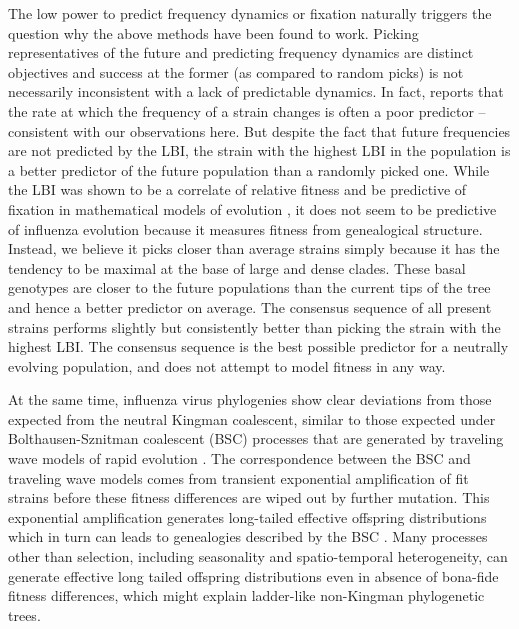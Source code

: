 \documentclass[reprint,amsmath,amssymb,superscriptaddress,showpacs,rmp]{revtex4-1}
\begin{document}
The low power to predict frequency dynamics or fixation naturally triggers the question why the above methods have been found to work.
Picking representatives of the future and predicting frequency dynamics are distinct objectives and success at the former (as compared to random picks) is not necessarily inconsistent with a lack of predictable dynamics.
In fact, \citep{huddleston_integrating_2020} reports that the rate at which the frequency of a strain changes is often a poor predictor -- consistent with our observations here.
But despite the fact that future frequencies are not predicted by the LBI, the strain with the highest LBI in the population is a better predictor of the future population than a randomly picked one.
While the LBI was shown to be a correlate of relative fitness and be predictive of fixation in mathematical models of evolution \citep{neher_predicting_2014}, it does not seem to be predictive of influenza evolution because it measures fitness from genealogical structure.
Instead, we believe it picks closer than average strains simply because it has the tendency to be maximal at the base of large and dense clades.
These basal genotypes are closer to the future populations than the current tips of the tree and hence a better predictor on average.
The consensus sequence of all present strains performs slightly but consistently better than picking the strain with the highest LBI.
The consensus sequence is the best possible predictor for a neutrally evolving population, and does not attempt to model fitness in any way.

At the same time, influenza virus phylogenies show clear deviations from those expected from the neutral Kingman coalescent, similar to those expected under Bolthausen-Sznitman coalescent (BSC) processes that are generated by traveling wave models of rapid evolution \citep{neher_genealogies_2013,desai_genetic_2013}.
The correspondence between the BSC and traveling wave models comes from transient exponential amplification of fit strains before these fitness differences are wiped out by further mutation.
This exponential amplification generates long-tailed effective offspring distributions which in turn can leads to genealogies described by the BSC \citep{schweinsberg_coalescent_2003,neher_genealogies_2013}.
Many processes other than selection, including seasonality and spatio-temporal heterogeneity, can generate effective long tailed offspring distributions even in absence of bona-fide fitness differences, which might explain ladder-like non-Kingman phylogenetic trees.
\end{document}
